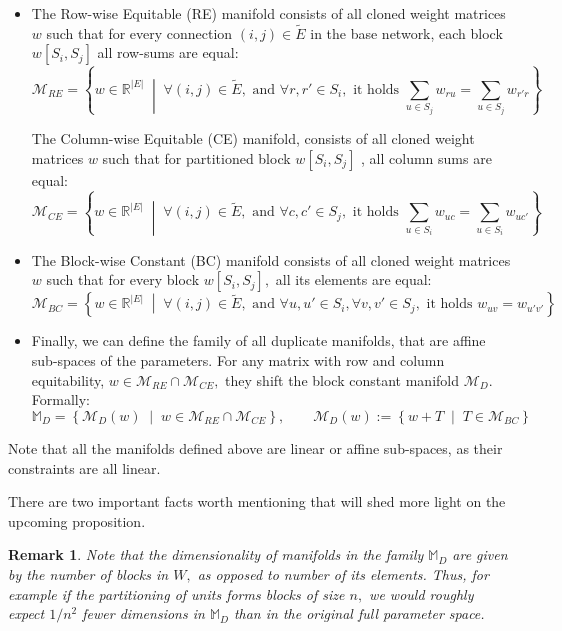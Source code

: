 \documentclass{article}
\newcommand{\R}{\mathbb{R}}
\newcommand{\BaseE}{\widetilde{E}}
\newcommand{\ManifoldD}{\mathcal{M}_{D}}
\newcommand{\ManifoldRE}{\mathcal{M}_{RE}}
\newcommand{\ManifoldCE}{\mathcal{M}_{CE}}
\newcommand{\ManifoldBC}{\mathcal{M}_{BC}}
\newtheorem{remark}{Remark}[section]
\numberwithin{figure}{section}
\begin{document}
\begin{itemize}
    \item  The Row-wise Equitable (RE) manifold consists of all cloned weight matrices $w$ such that for every connection $(i,j) \in \BaseE$ in the base network, each block $w[S_i, S_j]$ all row-sums are equal:
    $$
\ManifoldRE = \left\{ w\in \R^{|E|} \;\middle|\; \forall (i,j) \in \BaseE, \text{ and } \forall r,r' \in S_i, \text{ it holds } \sum_{u \in S_j}  w_{r u} = \sum_{u \in S_j}  w_{r' r} \right\}
$$

The Column-wise Equitable (CE) manifold, consists of all cloned weight matrices $w$ such that for partitioned block $w[S_i, S_j]$ , all column sums are equal:
$$
\ManifoldCE = \left\{ w\in \R^{|E|} \;\middle|\; \forall (i,j) \in \BaseE, \text{ and } \forall c,c' \in S_j, \text{ it holds } \sum_{u \in S_i}  w_{u c} = \sum_{u \in S_i}  w_{u c'} \right\}
$$

\item The Block-wise Constant (BC) manifold consists of all cloned weight matrices $w$ such that for every block $w[S_i, S_j],$ all its elements are equal:
$$
\ManifoldBC = \left\{ w\in \R^{|E|} \;\middle|\; \forall (i,j) \in \BaseE, \text{ and } \forall u,u' \in S_i, \forall v,v' \in S_j, \text{ it holds }  w_{uv} = w_{u'v'} \right\}
$$
\item Finally, we can define the family of all duplicate manifolds, that are affine sub-spaces of the parameters. For any matrix with row and column equitability, $w\in \ManifoldRE\cap\ManifoldCE,$ they shift the block constant manifold $\ManifoldD.$ Formally:
$$
\mathbb{M}_D = \left\{ \ManifoldD(w) \;\middle|\; w\in \ManifoldRE\cap\ManifoldCE \right\}, \qquad \ManifoldD(w):= \left\{w+T\;\middle|\; T\in \ManifoldBC \right\}
$$
\end{itemize}

Note that all the manifolds defined above are linear or affine sub-spaces, as their constraints are all linear. 

There are two important facts worth mentioning that will shed more light on the upcoming proposition. 

\begin{remark}
Note that the dimensionality of manifolds in the family $\mathbb{M}_D$ are given by the number of blocks in $W,$ as opposed to number of its elements. Thus, for example if the partitioning of units forms blocks of size $n,$ we would roughly expect $1/n^2$ fewer dimensions in $\mathbb{M}_D$ than in the original full parameter space. 
\end{remark}
\end{document}
